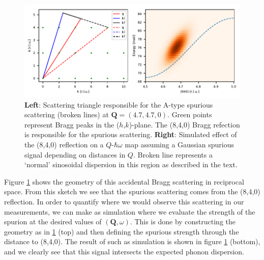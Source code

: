 \begin{figure}
    \centering
    \includegraphics[width=\textwidth]{fig/anomaly/spurion.pdf}
    \caption{\textbf{Left}: Scattering triangle responsible for the A-type spurious scattering (broken lines) at $\bm{Q} = (4.7,4.7,0)$. Green points represent Bragg peaks in the ($h$,$k$)-plane. The (8,4,0) Bragg refection is responsible for the spurious scattering. \textbf{Right}: Simulated effect of the (8,4,0) reflection on a $Q$-$\hbar\omega$ map assuming a Gaussian spurious signal depending on distances in $Q$. Broken line represents a `normal' sinosoidal dispersion in this region as described in the text.}
    \label{fig:in8_spurion}
\end{figure}

Figure \ref{fig:in8_spurion} shows the geometry of this accidental Bragg scattering in reciprocal space. From this sketch we see that the spurious scattering comes from the (8,4,0) reflection. In order to quantify where we would observe this scattering in our measurements, we can make as simulation where we evaluate the strength of the spurion at the desired values of $(\bm{Q}, \omega)$. This is done by constructing the geometry as in \ref{fig:in8_spurion} (top) and then defining the spurious strength through the distance to (8,4,0). The result of such as simulation is shown in figure \ref{fig:in8_spurion} (bottom), and we clearly see that this signal intersects the expected phonon dispersion.

